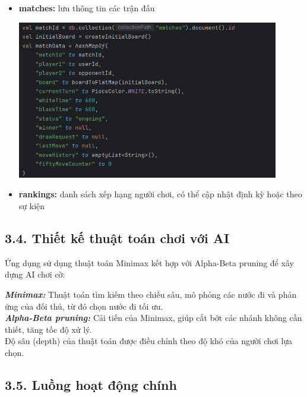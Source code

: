 \documentclass[a4paper,12pt]{article}
\begin{document}
\begin{itemize}[label=·]
\begin{center}
          \end{center}
    \item \textbf{matches:} lưu thông tin các trận đấu
          \begin{center}
              \includegraphics[width=0.9\textwidth]{img/match.png}
          \end{center}
    \item \textbf{rankings:} danh sách xếp hạng người chơi, có thể cập nhật định kỳ hoặc theo sự kiện
\end{itemize}

\subsection*{3.4. Thiết kế thuật toán chơi với AI} %

\justify
\noindent Ứng dụng sử dụng thuật toán Minimax kết hợp với Alpha-Beta pruning để xây dựng AI chơi cờ:

\noindent \textbf{\large \textit{Minimax:}} Thuật toán tìm kiếm theo chiều sâu, mô phỏng các nước đi và phản ứng của đối thủ, từ đó chọn nước đi tối ưu.\\

\noindent \textbf{\large \textit{Alpha-Beta pruning:}} Cải tiến của Minimax, giúp cắt bớt các nhánh không cần thiết, tăng tốc độ xử lý.\\
\noindent Độ sâu (depth) của thuật toán được điều chỉnh theo độ khó của người chơi lựa chọn.

\subsection*{3.5. Luồng hoạt động chính} %
\end{document}
